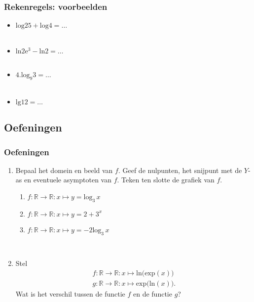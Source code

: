 \begin{frame}
\frametitle{Rekenregels: voorbeelden}
\pause
\begin{itemize}
\item<+-> $\mbox{log} 25 + \mbox{log} 4 = \ldots$\\~
\item<+-> $\mbox{ln} 2\mbox{e}^3 - \mbox{ln} 2 = \ldots$\\~
\item<+-> $4.\mbox{log}_9 3 = \ldots$\\~
\item<+-> $\displaystyle \mbox{lg} 12 = \ldots$
\end{itemize} 
\end{frame}

\subsection*{Oefeningen}

\begin{frame}
\frametitle{Oefeningen}
\pause
\begin{enumerate}
\item<+-> Bepaal het domein en beeld van $f$. Geef de nulpunten, het snijpunt met de $Y$-as en eventuele asymptoten van $f$. Teken ten slotte de grafiek van $f$. 
      \begin{enumerate}
      \item<+->[(a)] $f:\mathbb{R}\rightarrow \mathbb{R}:x\mapsto y=\mbox{log}_3\, x$
      \item<+->[(b)] $f:\mathbb{R}\rightarrow \mathbb{R}:x\mapsto y=2+3^x$
      \item<+->[(c)] $f:\mathbb{R}\rightarrow \mathbb{R}:x\mapsto y=-2\mbox{log}_3\, x$
      \end{enumerate}~\\
\item<+-> Stel 
      \[\begin{array}{c}
        f:\mathbb{R}\rightarrow \mathbb{R}: x\mapsto \mbox{ln(exp}(x))\\
        g:\mathbb{R}\rightarrow \mathbb{R}: x\mapsto \mbox{exp(ln}(x)).
        \end{array}\]
      Wat is het verschil tussen de functie $f$ en de functie $g$?\\
\end{enumerate}
\end{frame}

